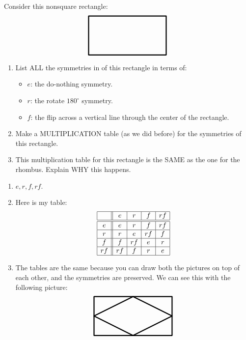 \documentclass[noauthor,nooutcomes,12pt,hints,handout]{ximera}
\begin{document}
\begin{question}
  Consider this nonsquare rectangle:
  \[
  \begin{tikzpicture}
    \draw[ultra thick,rounded corners=.05mm] (0,0) -- (4,0) -- (4,2) -- (0,2)-- cycle;
  \end{tikzpicture}
  \]
  \begin{enumerate}
  \item List ALL the symmetries in of this rectangle in terms of:
    \begin{itemize}
    \item $e$: the do-nothing symmetry.
    \item $r$: the rotate $180^\circ$ symmetry.
    \item $f$: the flip across a vertical line through the center of the rectangle.
    \end{itemize}
  \item Make a MULTIPLICATION table (as we did before) for the
    symmetries of this rectangle.
  \item This multiplication table for this rectangle is the SAME as
    the one for the rhombus. Explain WHY this happens.
  \end{enumerate}
  \begin{freeResponse}
    \begin{enumerate}
    \item $e, r,f,rf$.
    \item Here is my table:
      \[
      \begin{array}{|c||c|c|c|c|c|c|}
    \hline
    & e  & r  & f  & rf \\ \hline\hline
    e  & e  & r  & f  & rf \\ \hline
    r  & r  & e  & rf & f \\ \hline
    f  & f  & rf & e  & r \\ \hline
    rf & rf & f  & r  & e \\ \hline
      \end{array}
      \]
      \item The tables are the same because you can draw both the
        pictures on top of each other, and the symmetries are
        preserved. We can see this with the following picture:
     \[
  \begin{tikzpicture}
    \draw[ultra thick,rounded corners=.05mm] (0,0) -- (4,0) -- (4,2) -- (0,2)-- cycle; %
    \draw[ultra thick,rounded corners=.05mm] (0,1) -- (2,0) -- (4,1) -- (2,2)-- cycle; %
  \end{tikzpicture}
  \]    
    \end{enumerate}
  \end{freeResponse}
\end{question}
\end{document}
